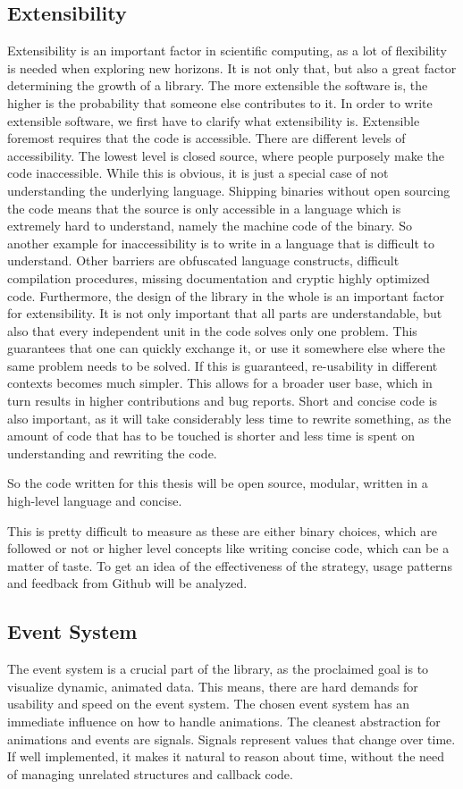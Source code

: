 \subsection{Extensibility}
Extensibility is an important factor in scientific computing, as a lot of flexibility is needed when exploring new horizons. 
It is not only that, but also a great factor determining the growth of a library. The more extensible the software is, the higher is the probability that someone else contributes to it.
In order to write extensible software, we first have to clarify what extensibility is.
Extensible foremost requires that the code is accessible. There are different levels of accessibility. 
The lowest level is closed source, where people purposely make the code inaccessible. While this is obvious, it is just a special case of not understanding the underlying language. 
Shipping binaries without open sourcing the code means that the source is only accessible in a language which is extremely hard to understand, namely the machine code of the binary. So another example for inaccessibility is to write in a language that is difficult to understand. 
Other barriers are obfuscated language constructs, difficult compilation procedures, missing documentation and cryptic highly optimized code.
Furthermore, the design of the library in the whole is an important factor for extensibility. It is not only important that all parts are understandable, but also that every independent unit in the code solves only one problem. 
This guarantees that one can quickly exchange it, or use it somewhere else where the same problem needs to be solved.
If this is guaranteed, re-usability in different contexts becomes much simpler. 
This allows for a broader user base, which in turn results in higher contributions and bug reports.
Short and concise code is also important, as it will take considerably less time to rewrite something, as the amount of code that has to be touched is shorter and less time is spent on understanding and rewriting the code.

So the code written for this thesis will be open source, modular, written in a high-level language and concise.

This is pretty difficult to measure as these are either binary choices, which are followed or not or higher level concepts like writing concise code, which can be a matter of taste.
To get an idea of the effectiveness of the strategy, usage patterns and feedback from Github will be analyzed.

\subsection{Event System}
The event system is a crucial part of the library, as the proclaimed goal is to visualize dynamic, animated data.
This means, there are hard demands for usability and speed on the event system.
The chosen event system has an immediate influence on how to handle animations. 
The cleanest abstraction for animations and events are signals. Signals represent values that change over time.
If well implemented, it makes it natural to reason about time, without the need of managing unrelated structures and callback code.

